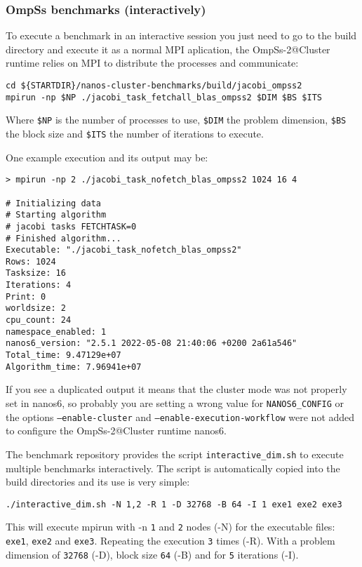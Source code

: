 \documentclass{article}
\newcommand{\code}[1]{\texttt{#1}}
\begin{document}
\subsubsection{OmpSs benchmarks (interactively)}
To execute a benchmark in an interactive session you just need to go
to the build directory and execute it as a normal MPI aplication, the
OmpSs-2@Cluster runtime relies on MPI to distribute the processes and
communicate:

\begin{lstlisting}
cd ${STARTDIR}/nanos-cluster-benchmarks/build/jacobi_ompss2
mpirun -np $NP ./jacobi_task_fetchall_blas_ompss2 $DIM $BS $ITS
\end{lstlisting}

Where \code{\$NP} is the number of processes to use, \code{\$DIM} the
problem dimension, \code{\$BS} the block size and \code{\$ITS} the
number of iterations to execute.

One example execution and its output may be:
\begin{lstlisting}
> mpirun -np 2 ./jacobi_task_nofetch_blas_ompss2 1024 16 4

# Initializing data
# Starting algorithm
# jacobi tasks FETCHTASK=0
# Finished algorithm...
Executable: "./jacobi_task_nofetch_blas_ompss2"
Rows: 1024
Tasksize: 16
Iterations: 4
Print: 0
worldsize: 2
cpu_count: 24
namespace_enabled: 1
nanos6_version: "2.5.1 2022-05-08 21:40:06 +0200 2a61a546"
Total_time: 9.47129e+07
Algorithm_time: 7.96941e+07
\end{lstlisting}

If you see a duplicated output it means that the cluster mode was not
properly set in nanos6, so probably you are setting a wrong value for
\code{NANOS6\_CONFIG} or the options \code{--enable-cluster} and
\code{--enable-execution-workflow} were not added to configure the
OmpSs-2@Cluster runtime nanos6.

The benchmark repository provides the script \code{interactive\_dim.sh}
to execute multiple benchmarks interactively. The script is
automatically copied into the build directories and its use is very
simple:

\begin{lstlisting}
./interactive_dim.sh -N 1,2 -R 1 -D 32768 -B 64 -I 1 exe1 exe2 exe3
\end{lstlisting}

This will execute mpirun with -n \code{1} and \code{2} nodes (-N) for
the executable files: \code{exe1}, \code{exe2} and
\code{exe3}. Repeating the execution \code{3} times (-R). With a
problem dimension of \code{32768} (-D), block size \code{64} (-B) and
for \code{5} iterations (-I).
\end{document}
